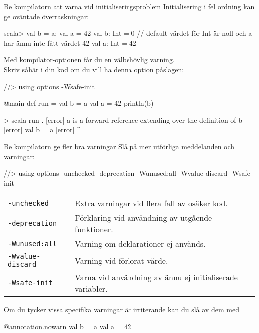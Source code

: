 \begin{Slide}{Be kompilatorn att varna vid initialiseringsproblem}
\SlideFontSmall
Initialisering i fel ordning kan ge oväntade överraskningar:
\begin{REPLsmall}
scala> { val b = a; val a = 42 }
val b: Int = 0   // default-värdet för Int är noll och a har ännu inte fått värdet 42
val a: Int = 42
\end{REPLsmall}
Med kompilator-optionen  får du en välbehövlig varning. \\
Skriv såhär i din kod om du vill ha denna option påslagen:
\begin{CodeSmall}
//> using options -Wsafe-init

@main def run =
  val b = a
  val a = 42
  println(b)

\end{CodeSmall}
\begin{REPLsmall}
>  scala run .
[error] a is a forward reference extending over the definition of b
[error]   val b = a
[error]           ^
\end{REPLsmall}
\end{Slide}

\begin{Slide}{Be kompilatorn ge fler bra varningar}\SlideFontSmall
Slå på mer utförliga meddelanden och varningar:
\begin{CodeSmall}
//> using options -unchecked -deprecation -Wunused:all -Wvalue-discard -Wsafe-init
\end{CodeSmall}
\begin{tabular}{l p{8.5cm}}
\texttt{-unchecked} & Extra varningar vid flera fall av osäker kod. \\
\texttt{-deprecation} & Förklaring vid användning av utgående funktioner. \\
\texttt{-Wunused:all} & Varning om deklarationer ej används. \\
\texttt{-Wvalue-discard} & Varning vid förlorat värde. \\
\texttt{-Wsafe-init} & Varna vid användning av ännu ej initialiserade variabler. \\
\end{tabular}

\pause\vspace*{1em}
Om du tycker vissa specifika varningar är irriterande kan du slå av dem med  
\begin{CodeSmall}
  @annotation.nowarn 
  val b = a
  val a = 42 
\end{CodeSmall}
  
\end{Slide}

